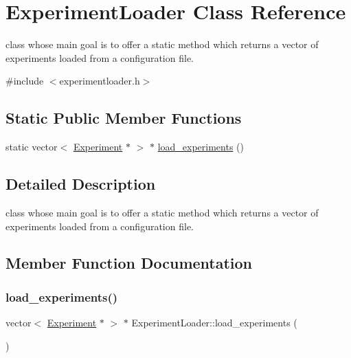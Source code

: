 \hypertarget{class_experiment_loader}{}\section{Experiment\+Loader Class Reference}
\label{class_experiment_loader}


class whose main goal is to offer a static method which returns a vector of experiments loaded from a configuration file.  




{\ttfamily \#include $<$experimentloader.\+h$>$}

\subsection*{Static Public Member Functions}
\begin{DoxyCompactItemize}
\item 
static vector$<$ \mbox{\hyperlink{class_experiment}{Experiment}} $\ast$ $>$ $\ast$ \mbox{\hyperlink{class_experiment_loader_a1884a60d8ebc82544600e91c37fbc831}{load\+\_\+experiments}} ()
\end{DoxyCompactItemize}


\subsection{Detailed Description}
class whose main goal is to offer a static method which returns a vector of experiments loaded from a configuration file. 

\subsection{Member Function Documentation}
\mbox{\label{class_experiment_loader_a1884a60d8ebc82544600e91c37fbc831}} 
\subsubsection{\texorpdfstring{load\+\_\+experiments()}{load\_experiments()}}
{\footnotesize\ttfamily vector$<$ \mbox{\hyperlink{class_experiment}{Experiment}} $\ast$ $>$ $\ast$ Experiment\+Loader\+::load\+\_\+experiments (\begin{DoxyParamCaption}{ }\end{DoxyParamCaption})\hspace{0.3cm}{\ttfamily [static]}}

